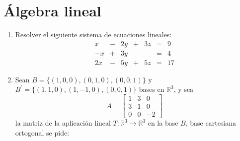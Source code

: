 \section{Álgebra lineal}

\begin{enumerate}
\item Resolver el siguiente sistema de ecuaciones lineales:$$
  \begin{array}{ccccccc}
    x & - & 2y & + & 3z & = & 9\\
    -x & + & 3y &  &  & = & 4\\
    2x & - & 5y & + & 5z & = & 17\end{array}$$

\item Sean $B=\{(1,0,0),(0,1,0),(0,0,1)\}$ y
  $B^{\prime}=\{(1,1,0),(1,-1,0),(0,0,1)\}$ bases en $\mathbb{R}^{3}$,
  y sea $$ A=\left[\begin{array}{ccc}
      1 & 3 & 0\\
      3 & 1 & 0\\
      0 & 0 & -2\end{array}\right]$$ la matriz de la aplicación lineal
  $T:\mathbb{R}^{3}\rightarrow\mathbb{R}^{3}$ en la base $B$, base
  cartesiana ortogonal se pide:


\end{enumerate}
